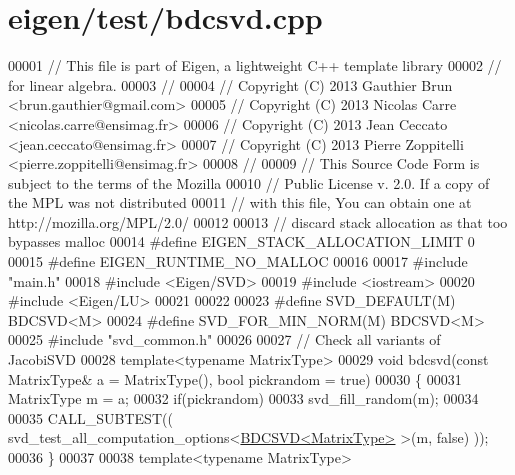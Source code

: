 \hypertarget{eigen_2test_2bdcsvd_8cpp_source}{}\section{eigen/test/bdcsvd.cpp}
\label{eigen_2test_2bdcsvd_8cpp_source}

\begin{DoxyCode}
00001 \textcolor{comment}{// This file is part of Eigen, a lightweight C++ template library}
00002 \textcolor{comment}{// for linear algebra.}
00003 \textcolor{comment}{//}
00004 \textcolor{comment}{// Copyright (C) 2013 Gauthier Brun <brun.gauthier@gmail.com>}
00005 \textcolor{comment}{// Copyright (C) 2013 Nicolas Carre <nicolas.carre@ensimag.fr>}
00006 \textcolor{comment}{// Copyright (C) 2013 Jean Ceccato <jean.ceccato@ensimag.fr>}
00007 \textcolor{comment}{// Copyright (C) 2013 Pierre Zoppitelli <pierre.zoppitelli@ensimag.fr>}
00008 \textcolor{comment}{//}
00009 \textcolor{comment}{// This Source Code Form is subject to the terms of the Mozilla}
00010 \textcolor{comment}{// Public License v. 2.0. If a copy of the MPL was not distributed}
00011 \textcolor{comment}{// with this file, You can obtain one at http://mozilla.org/MPL/2.0/}
00012 
00013 \textcolor{comment}{// discard stack allocation as that too bypasses malloc}
00014 \textcolor{preprocessor}{#define EIGEN\_STACK\_ALLOCATION\_LIMIT 0}
00015 \textcolor{preprocessor}{#define EIGEN\_RUNTIME\_NO\_MALLOC}
00016 
00017 \textcolor{preprocessor}{#include "main.h"}
00018 \textcolor{preprocessor}{#include <Eigen/SVD>}
00019 \textcolor{preprocessor}{#include <iostream>}
00020 \textcolor{preprocessor}{#include <Eigen/LU>}
00021 
00022 
00023 \textcolor{preprocessor}{#define SVD\_DEFAULT(M) BDCSVD<M>}
00024 \textcolor{preprocessor}{#define SVD\_FOR\_MIN\_NORM(M) BDCSVD<M>}
00025 \textcolor{preprocessor}{#include "svd\_common.h"}
00026 
00027 \textcolor{comment}{// Check all variants of JacobiSVD}
00028 \textcolor{keyword}{template}<\textcolor{keyword}{typename} MatrixType>
00029 \textcolor{keywordtype}{void} bdcsvd(\textcolor{keyword}{const} MatrixType& a = MatrixType(), \textcolor{keywordtype}{bool} pickrandom = \textcolor{keyword}{true})
00030 \{
00031   MatrixType m = a;
00032   \textcolor{keywordflow}{if}(pickrandom)
00033     svd\_fill\_random(m);
00034 
00035   CALL\_SUBTEST(( svd\_test\_all\_computation\_options<\hyperlink{group___s_v_d___module_class_eigen_1_1_b_d_c_s_v_d}{BDCSVD<MatrixType>} >(m, \textcolor{keyword}{false})  ));
00036 \}
00037 
00038 \textcolor{keyword}{template}<\textcolor{keyword}{typename} MatrixType>

\end{DoxyCode}
